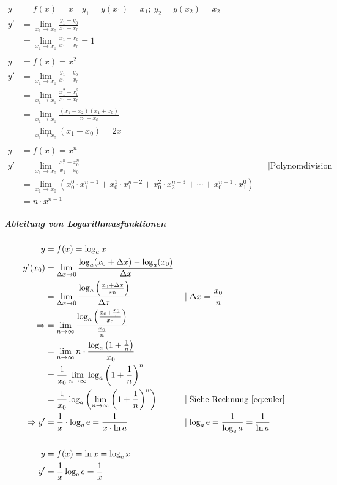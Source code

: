 \begin{align*}
    y &= f(x) = x \quad y_1 = y(x_1) = x_1;\ y_2 = y(x_2) = x_2 \\
    y' &= \lim_{x_1 \rightarrow x_0} \frac{y_1 - y_0}{x_1 - x_0} \\
    &= \lim_{x_1 \rightarrow x_0} \frac{x_1 - x_0}{x_1 - x_0} = 1 \\
    \\
    y &= f(x) = x^2 \\
    y' &= \lim_{x_1 \rightarrow x_0} \frac{y_1 - y_0}{x_1 - x_0} \\
    &= \lim_{x_1 \rightarrow x_0} \frac{x_1^2 - x_0^2}{x_1 - x_0} \\
    &= \lim_{x_1 \rightarrow x_0} \frac{(x_1 - x_2)(x_1 + x_0)}{x_1 - x_0} \\
    &= \lim_{x_1 \rightarrow x_0} (x_1 + x_0) = 2x \\
    \\
    y &= f(x) = x^n \\
    y' &= \lim_{x_1 \rightarrow x_0} \frac{x_1^n - x_0^n}{x_1 - x_0}  &&\mid \text{Polynomdivision} \\
    &= \lim_{x_1 \rightarrow x_0} (x_0^0 \cdot x_1^{n-1} + x_0^1 \cdot x_1^{n-2} + x_0^2 \cdot x_2^{n-3} + \cdots + x_0^{n-1} \cdot x_1^0)\\
    &= n \cdot x^{n-1}
\end{align*}

\subparagraph{Ableitung von Logarithmusfunktionen}

\begin{align*}
    y &= f(x) = \log_a x \\
    y'(x_0) &= \lim_{\Delta x \rightarrow 0} \frac{\log_a(x_0 + \Delta x) - \log_a(x_0)}{\Delta x} \\
    &= \lim_{\Delta x \rightarrow 0} \frac{\log_a \left( \frac{x_0 + \Delta x}{x_0} \right)}{\Delta x} &&\mid \Delta x = \frac{x_0}{n} \\
    \Rightarrow &= \lim_{n \rightarrow{} \infty} \frac{\log_a \left( \frac{x_0 + \frac{x_0}{n}} {x_0} \right)}{\frac{x_0}{n}} \\
    &= \lim_{n \rightarrow{} \infty} n \cdot \frac{\log_a \left( 1 + \frac{1}{n} \right)}{x_0} \\
    &= \frac{1}{x_0} \lim_{n \rightarrow{} \infty} \log_a {\left( 1 + \frac{1}{n} \right)}^{n} \\
    &= \frac{1}{x_0} \log_a \left( \lim_{n \rightarrow{} \infty} {\left( 1 + \frac{1}{n} \right)}^n \right) &&\mid \text{Siehe Rechnung \ref{eq:euler}} \\
    \Rightarrow y' &= \frac{1}{x} \cdot \log_a \mathop{}\!\mathrm{e} = \frac{1}{x \cdot \ln a} &&\mid \log_a \mathop{}\!\mathrm{e} = \frac{1}{\log_{\mathop{}\!\mathrm{e}} a} = \frac{1}{\ln a} \\
    \\
    y &= f(x) = \ln x = \log_{\mathop{}\!\mathrm{e}} x \\
    y' &= \frac{1}{x} \log_{\mathop{}\!\mathrm{e}} e = \frac{1}{x}
\end{align*}



